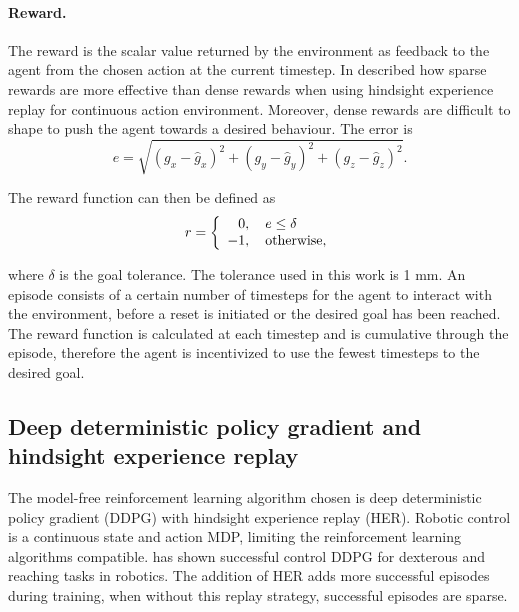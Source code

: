 \paragraph{Reward.} The reward is the scalar value returned by the environment as feedback to the agent from the chosen action at the current timestep. In \cite{andrychowicz2017hindsight} described how sparse rewards are more effective than dense rewards when using hindsight experience replay for continuous action environment. Moreover, dense rewards are difficult to shape to push the agent towards a desired behaviour. The error is
\begin{equation}
e = \sqrt{(g_x - \hat{g}_x)^2 + (g_y - \hat{g}_y)^2 + (g_z - \hat{g}_z)^2}. \label{eqn:7}
\end{equation}

The reward function can then be defined as
\begin{equation}
r =
  \left\{
    \begin{array}{l}
      \hphantom{-}0, \quad e \leq \delta \\
      -1, \quad \textnormal{otherwise},
    \end{array}
  \right. \label{eqn:8}
\end{equation}

where $\delta$ is the goal tolerance. The tolerance used in this work is 1 mm. An episode consists of a certain number of timesteps for the agent to interact with the environment, before a reset is initiated or the desired goal has been reached. The reward function is calculated at each timestep and is cumulative through the episode, therefore the agent is incentivized to use the fewest timesteps to the desired goal.

\subsection{Deep deterministic policy gradient and hindsight experience replay}
The model-free reinforcement learning algorithm chosen is deep deterministic policy gradient (DDPG) with hindsight experience replay (HER). Robotic control is a continuous state and action MDP, limiting the reinforcement learning algorithms compatible. \cite{andrychowicz2017hindsight} has shown successful control DDPG for dexterous and reaching tasks in robotics. The addition of HER adds more successful episodes during training, when without this replay strategy, successful episodes are sparse.

